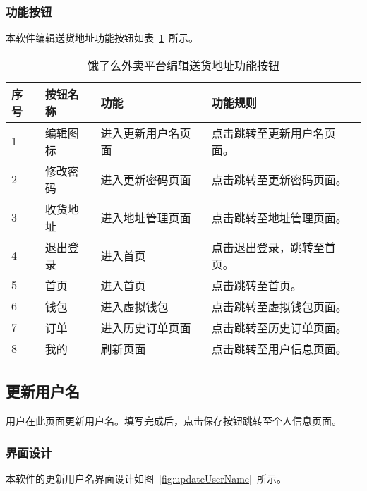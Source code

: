 \subsubsection{功能按钮}
本软件编辑送货地址功能按钮如表~\ref{tab:table16}~所示。
\begin{table}[htbp]
    \caption{饿了么外卖平台编辑送货地址功能按钮}\label{tab:table16}
    \vspace{0.5em}\wuhao
    \begin{tabularx}{\textwidth}{lllX}
    \toprule[1.5pt]
    序号 & 按钮名称 & 功能 & 功能规则 \\ 
    \midrule[1pt]
    1 & 编辑图标 & 进入更新用户名页面 & 点击跳转至更新用户名页面。 \\
    2 & 修改密码 & 进入更新密码页面 & 点击跳转至更新密码页面。 \\
    3 & 收货地址 & 进入地址管理页面 & 点击跳转至地址管理页面。 \\
    4 & 退出登录 & 进入首页 & 点击退出登录，跳转至首页。 \\
    5 & 首页 & 进入首页 & 点击跳转至首页。 \\
    6 & 钱包 & 进入虚拟钱包 & 点击跳转至虚拟钱包页面。 \\
    7 & 订单 & 进入历史订单页面 & 点击跳转至历史订单页面。 \\
    8 & 我的 & 刷新页面 & 点击跳转至用户信息页面。 \\
\bottomrule[1.5pt]
\end{tabularx}
\vspace{\baselineskip}
\end{table}

\subsection{更新用户名}
用户在此页面更新用户名。填写完成后，点击保存按钮跳转至个人信息页面。
\subsubsection{界面设计}
本软件的更新用户名界面设计如图~\ref{fig:updateUserName}~所示。
